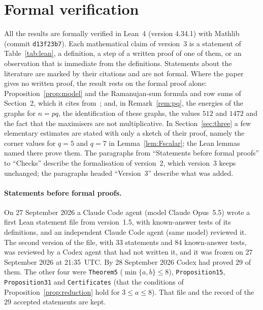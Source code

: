 \documentclass[11pt]{article}
\theoremstyle{remark}
\begin{document}
\section{Formal verification}\label{sec:verif}
All the results are formally verified in Lean~4 (version 4.34.1) with
Mathlib~\cite{mathlib} (commit \texttt{d13f23b7}). Each mathematical claim of
version~3 is a statement of Table~\ref{tab:lean}, a definition, a step of a
written proof of one of them, or an observation that is immediate from the
definitions. Statements about the literature are marked by their citations and
are not formal. Where the paper gives no written proof, the result rests on the
formal proof alone: Proposition~\ref{prop:model} and the Ramanujan-sum formula and
row sums of Section~2, which it cites from~\cite{jy}; and, in
Remark~\ref{rem:pq}, the energies of the graphs for $n=pq$, the identification of
these graphs, the values $512$ and $1472$ and the fact that the maximisers are not
multiplicative. In Section~\ref{sec:three} a few elementary estimates are stated
with only a sketch of their proof, namely the corner values for $q=5$ and $q=7$ in
Lemma~\ref{lem:Fscalar}; the Lean lemmas named there prove them. The paragraphs from
``Statements before formal proofs'' to ``Checks'' describe the formalisation of
version~2, which version~3 keeps unchanged; the paragraphs headed ``Version~3''
describe what was added.

\paragraph{Statements before formal proofs.}
On 27 September 2026 a Claude Code agent (model Claude Opus~5.5) wrote a first
Lean statement file from version~1.5, with known-answer tests of its definitions,
and an independent Claude Code agent (same model) reviewed it. The second version
of the file, with $33$ statements and $84$ known-answer tests, was reviewed by a
Codex agent that had not written it, and it was frozen on 27 September 2026 at
21:35~UTC. By 28 September 2026 Codex had proved $29$ of them. The other four
were \texttt{Theorem5} ($\min\{a,b\}\le8$), \texttt{Proposition15},
\texttt{Proposition31} and \texttt{Certificates} (that the conditions of
Proposition~\ref{prop:reduction} hold for $3\le a\le8$). That file and the record of
the $29$ accepted statements are kept.
\end{document}
